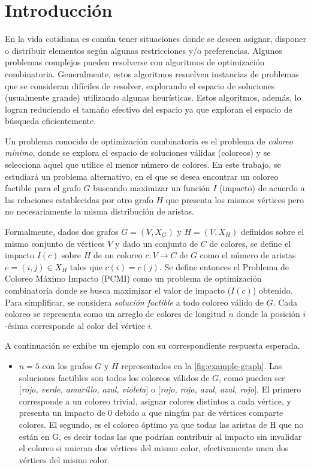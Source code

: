 \clearpage
\setcounter{page}{1}

\section{Introducción}

En la vida cotidiana es común tener situaciones donde se deseen asignar, disponer o distribuir elementos según algunas restricciones y/o preferencias. Algunos problemas complejos pueden resolverse con algoritmos de optimización combinatoria. Generalmente, estos algoritmos resuelven instancias de problemas que se consideran difíciles de resolver, explorando el espacio de soluciones (usualmente grande) utilizando algunas heurísticas. Estos algoritmos, además, lo logran reduciendo el tamaño efectivo del espacio ya que exploran el espacio de búsqueda eficientemente.

Un problema conocido de optimización combinatoria es el problema de \textit{coloreo mínimo}, donde se explora el espacio de soluciones válidas (coloreos) y se selecciona aquel que utilice el menor número de colores. En este trabajo, se estudiará un problema alternativo, en el que se desea encontrar un coloreo factible para el grafo $G$ buscando maximizar un función $I$ (impacto) de acuerdo a las relaciones establecidas por otro grafo $H$ que presenta los mismos vértices pero no necesariamente la misma distribución de aristas.

Formalmente, dados dos grafos $G=(V,X_G)$ y $H=(V,X_H)$ definidos sobre el mismo conjunto de vértices $V$ y dado un conjunto de $C$ de colores, se define el impacto $I(c)$ sobre $H$ de un coloreo $c:V\rightarrow C$ de $G$ como el número de aristas $e=(i,j)\in X_H$ tales que $c(i) = c(j)$. Se define entonces el Problema de Coloreo Máximo Impacto (PCMI) como un problema de optimización combinatoria donde se busca maximizar el valor de impacto ($I(c)$) obtenido. Para simplificar, se considera \textit{solución factible} a todo coloreo válido de $G$. Cada coloreo se representa como un arreglo de colores de longitud $n$ donde la posición $i$-ésima corresponde al color del vértice $i$.

A continuación se exhibe un ejemplo con su correspondiente respuesta esperada.

\begin{itemize}
    \item $n=5$ con los grafos $G$ y $H$ representados en la \cref{fig:example-graph}. Las soluciones factibles son todos los coloreos válidos de $G$, como pueden ser [\textit{rojo, verde, amarillo, azul, violeta}] o [\textit{rojo, rojo, azul, azul, rojo}]. El primero corresponde a un coloreo trivial, asignar colores distintos a cada vértice, y presenta un impacto de $0$ debido a que ningún par de vértices comparte colores. El segundo, es el coloreo óptimo ya que todas las aristas de H que no están en G, es decir todas las que podrían contribuir al impacto sin invalidar el coloreo si unieran dos vértices del mismo color, efectivamente unen dos vértices del mismo color.
\end{itemize}

